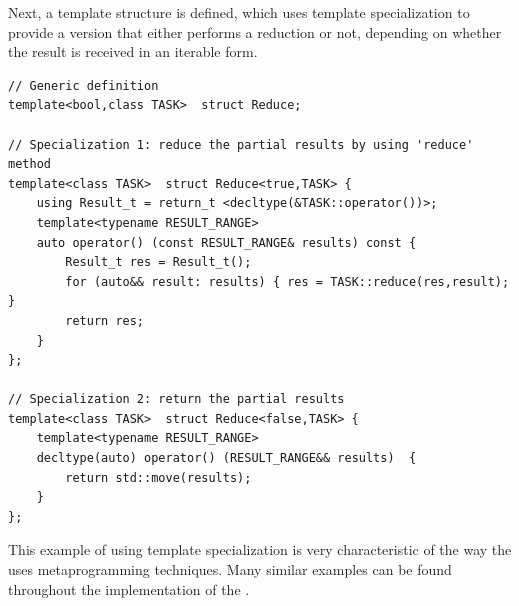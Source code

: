 Next, a template structure  is defined, which uses template specialization to provide a version that either performs 
a reduction or not, depending on whether the result is received in an iterable form. 
\begin{verbatim}
// Generic definition
template<bool,class TASK>  struct Reduce;

// Specialization 1: reduce the partial results by using 'reduce' method
template<class TASK>  struct Reduce<true,TASK> {
    using Result_t = return_t <decltype(&TASK::operator())>;
    template<typename RESULT_RANGE>
    auto operator() (const RESULT_RANGE& results) const {
        Result_t res = Result_t();
        for (auto&& result: results) { res = TASK::reduce(res,result); }
        return res;
    }
};

// Specialization 2: return the partial results
template<class TASK>  struct Reduce<false,TASK> {
    template<typename RESULT_RANGE>
    decltype(auto) operator() (RESULT_RANGE&& results)  {
        return std::move(results);
    }
};
\end{verbatim}
This example of using template specialization is very characteristic of the way the \BPL uses metaprogramming techniques. 
Many similar examples can be found throughout the implementation of the \BPL. 



